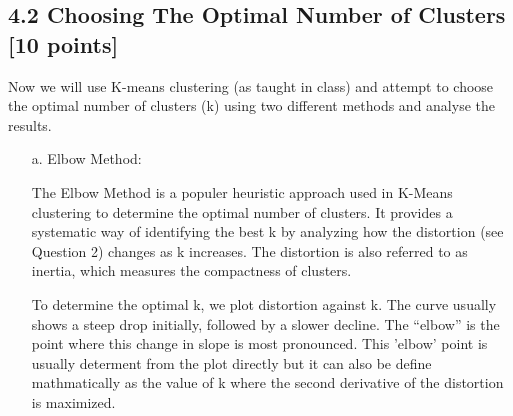 \documentclass[a3paper,12pt]{extarticle} %
\begin{document}
\begin{enumerate}
\begin{itemize}
\end{itemize}

\subsection*{4.2 Choosing The Optimal Number of Clusters [10 points]}
Now we will use K-means clustering (as taught in class) and attempt to choose the optimal number of clusters (k) using two different methods and analyse the results.

\begin{itemize}
\item[a.] Elbow Method:

The Elbow Method is a populer heuristic approach used in K-Means clustering to determine the optimal number of clusters. It provides a systematic way of identifying the best k by analyzing how the distortion (see Question 2) changes as k increases. The distortion is also referred to as inertia, which measures the compactness of clusters.

To determine the optimal k, we plot distortion against k. The curve usually shows a steep drop initially, followed by a slower decline. The ``elbow'' is the point where this change in slope is most pronounced. This 'elbow' point is usually determent from the plot directly but it can also be define mathmatically as the value of k where the second derivative of the distortion is maximized.


\end{itemize}
\end{enumerate}
\end{document}
